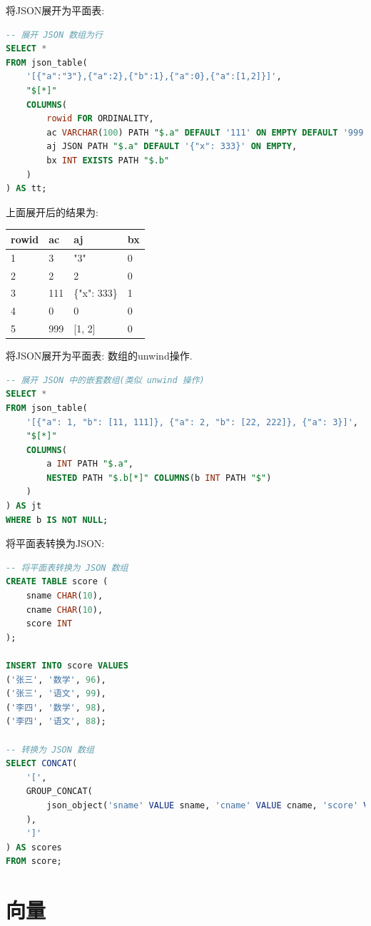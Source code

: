 将JSON展开为平面表:
\begin{lstlisting}[language=SQL]
-- 展开 JSON 数组为行
SELECT *
FROM json_table(
    '[{"a":"3"},{"a":2},{"b":1},{"a":0},{"a":[1,2]}]',
    "$[*]"
    COLUMNS(
        rowid FOR ORDINALITY,
        ac VARCHAR(100) PATH "$.a" DEFAULT '111' ON EMPTY DEFAULT '999' ON ERROR,
        aj JSON PATH "$.a" DEFAULT '{"x": 333}' ON EMPTY,
        bx INT EXISTS PATH "$.b"
    )
) AS tt;
\end{lstlisting}
上面展开后的结果为:
\begin{table}[H]
    \centering
    \begin{tabular}{|l|l|l|l|}
        \hline
        rowid & ac & aj & bx \\ \hline
        1 & 3 & "3" & 0 \\ \hline
        2 & 2 & 2 & 0 \\ \hline
        3 & 111 & \{"x": 333\} & 1 \\ \hline
        4 & 0 & 0 & 0 \\ \hline
        5 & 999 & [1, 2] & 0 \\ \hline
    \end{tabular}
\end{table}

将JSON展开为平面表: 数组的unwind操作.
\begin{lstlisting}[language=SQL]
-- 展开 JSON 中的嵌套数组(类似 unwind 操作)
SELECT *
FROM json_table(
    '[{"a": 1, "b": [11, 111]}, {"a": 2, "b": [22, 222]}, {"a": 3}]',
    "$[*]"
    COLUMNS(
        a INT PATH "$.a",
        NESTED PATH "$.b[*]" COLUMNS(b INT PATH "$")
    )
) AS jt
WHERE b IS NOT NULL;
\end{lstlisting}

将平面表转换为JSON:
\begin{lstlisting}[language=SQL]
-- 将平面表转换为 JSON 数组
CREATE TABLE score (
    sname CHAR(10),
    cname CHAR(10),
    score INT
);

INSERT INTO score VALUES
('张三', '数学', 96),
('张三', '语文', 99),
('李四', '数学', 98),
('李四', '语文', 88);

-- 转换为 JSON 数组
SELECT CONCAT(
    '[',
    GROUP_CONCAT(
        json_object('sname' VALUE sname, 'cname' VALUE cname, 'score' VALUE score)
    ),
    ']'
) AS scores
FROM score;
\end{lstlisting}

\section{向量}

